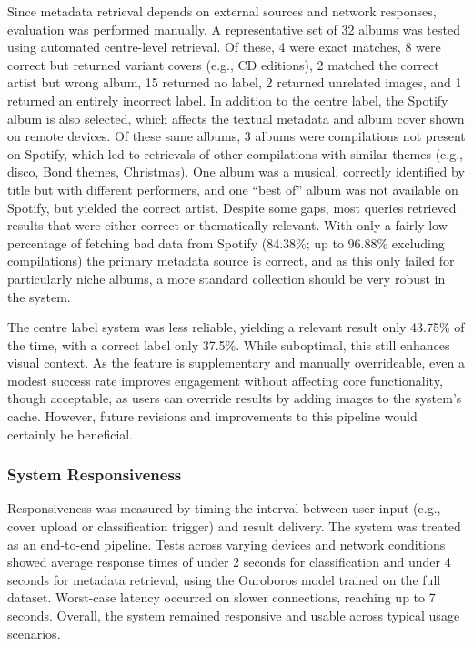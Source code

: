                Since metadata retrieval depends on external sources and network responses, evaluation was performed manually. A representative set of 32 albums was tested using automated centre-level retrieval. Of these, 4 were exact matches, 8 were correct but returned variant covers (e.g., CD editions), 2 matched the correct artist but wrong album, 15 returned no label, 2 returned unrelated images, and 1 returned an entirely incorrect label. In addition to the centre label, the Spotify album is also selected, which affects the textual metadata and album cover shown on remote devices. Of these same albums, 3 albums were compilations not present on Spotify, which led to retrievals of other compilations with similar themes (e.g., disco, Bond themes, Christmas). One album was a musical, correctly identified by title but with different performers, and one “best of” album was not available on Spotify, but yielded the correct artist. Despite some gaps, most queries retrieved results that were either correct or thematically relevant. With only a fairly low percentage of fetching bad data from Spotify (84.38\%; up to 96.88\% excluding compilations) the primary metadata source is correct, and as this only failed for particularly niche albums, a more standard collection should be very robust in the system.
    
                The centre label system was less reliable, yielding a relevant result only 43.75\% of the time, with a correct label only 37.5\%. While suboptimal, this still enhances visual context. As the feature is supplementary and manually overrideable, even a modest success rate improves engagement without affecting core functionality, though acceptable, as users can override results by adding images to the system's cache. However, future revisions and improvements to this pipeline would certainly be beneficial.
    
            \subsubsection{System Responsiveness}
    
                Responsiveness was measured by timing the interval between user input (e.g., cover upload or classification trigger) and result delivery. The system was treated as an end-to-end pipeline. Tests across varying devices and network conditions showed average response times of under 2 seconds for classification and under 4 seconds for metadata retrieval, using the Ouroboros model trained on the full dataset. Worst-case latency occurred on slower connections, reaching up to 7 seconds. Overall, the system remained responsive and usable across typical usage scenarios.
    

